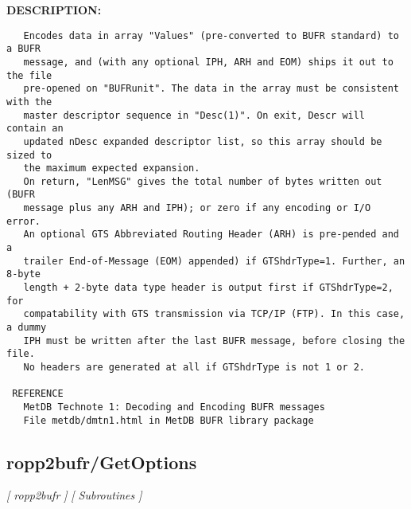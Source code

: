 \textbf{DESCRIPTION:}\hspace{0.08in}\begin{Verbatim}
   Encodes data in array "Values" (pre-converted to BUFR standard) to a BUFR
   message, and (with any optional IPH, ARH and EOM) ships it out to the file
   pre-opened on "BUFRunit". The data in the array must be consistent with the
   master descriptor sequence in "Desc(1)". On exit, Descr will contain an
   updated nDesc expanded descriptor list, so this array should be sized to
   the maximum expected expansion.
   On return, "LenMSG" gives the total number of bytes written out (BUFR
   message plus any ARH and IPH); or zero if any encoding or I/O error.
   An optional GTS Abbreviated Routing Header (ARH) is pre-pended and a
   trailer End-of-Message (EOM) appended) if GTShdrType=1. Further, an 8-byte
   length + 2-byte data type header is output first if GTShdrType=2, for
   compatability with GTS transmission via TCP/IP (FTP). In this case, a dummy
   IPH must be written after the last BUFR message, before closing the file.
   No headers are generated at all if GTShdrType is not 1 or 2.

 REFERENCE
   MetDB Technote 1: Decoding and Encoding BUFR messages
   File metdb/dmtn1.html in MetDB BUFR library package
\end{Verbatim}
\subsection{ropp2bufr/GetOptions}
\textsl{[ ropp2bufr ]}
\textsl{[ Subroutines ]}

